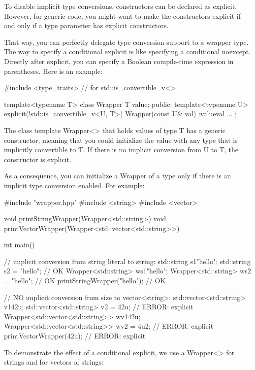 
To disable implicit type conversions, constructors can be declared as explicit. However, for generic code, you might want to make the constructors explicit if and only if a type parameter has explicit constructors.

That way, you can perfectly delegate type conversion support to a wrapper type.
The way to specify a conditional explicit is like specifying a conditional noexcept. Directly after explicit, you can specify a Boolean compile-time expression in parentheses. Here is an example:


\begin{cpp}
#include <type_traits> // for std::is_convertible_v<>

template<typename T>
class Wrapper {
	T value;
public:
	template<typename U>
	explicit(!std::is_convertible_v<U, T>)
	Wrapper(const U& val)
	:value{val} {
	}
	...
};
\end{cpp}

The class template Wrapper<> that holds values of type T has a generic constructor, meaning that you could initialize the value with any type that is implicitly convertible to T. If there is no implicit conversion from U to T, the constructor is explicit.

As a consequence, you can initialize a Wrapper of a type only if there is an implicit type conversion enabled. For example:


\begin{cpp}
#include "wrapper.hpp"
#include <string>
#include <vector>

void printStringWrapper(Wrapper<std::string>) {
}
void printVectorWrapper(Wrapper<std::vector<std::string>>) {
}

int main()
{
	// implicit conversion from string literal to string:
	std::string s1{"hello"};
	std::string s2 = "hello"; // OK
	Wrapper<std::string> ws1{"hello"};
	Wrapper<std::string> ws2 = "hello"; // OK
	printStringWrapper("hello"); // OK
	
	// NO implicit conversion from size to vector<string>:
	std::vector<std::string> v1{42u};
	std::vector<std::string> v2 = 42u; // ERROR: explicit
	Wrapper<std::vector<std::string>> wv1{42u};
	Wrapper<std::vector<std::string>> wv2 = 4u2; // ERROR: explicit
	printVectorWrapper(42u); // ERROR: explicit
}
\end{cpp}

To demonstrate the effect of a conditional explicit, we use a Wrapper<> for strings and for vectors of strings:

